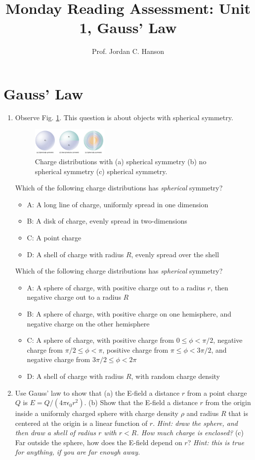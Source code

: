 \documentclass{article}
\begin{document}
\title{Monday Reading Assessment: Unit 1, Gauss' Law}
\author{Prof. Jordan C. Hanson}

\maketitle

\section{Gauss' Law}

\begin{enumerate}
\item Observe Fig. \ref{fig:spheres1}.  This question is about objects with spherical symmetry.
\begin{figure}[ht]
\centering
\includegraphics[width=0.35\textwidth]{spheres.png}
\caption{\label{fig:spheres1} Charge distributions with (a) spherical symmetry (b) no spherical symmetry (c) spherical symmetry.}
\end{figure}
Which of the following charge distributions has \textit{spherical} symmetry?
\begin{itemize}
\item A: A long line of charge, uniformly spread in one dimension
\item B: A disk of charge, evenly spread in two-dimensions
\item C: A point charge
\item D: A shell of charge with radius $R$, evenly spread over the shell
\end{itemize}
Which of the following charge distributions has \textit{spherical} symmetry?
\begin{itemize}
\item A: A sphere of charge, with positive charge out to a radius $r$, then negative charge out to a radius $R$
\item B: A sphere of charge, with positive charge on one hemisphere, and negative charge on the other hemisphere
\item C: A sphere of charge, with positive charge from $0 \leq \phi < \pi/2$, negative charge from $\pi/2 \leq \phi < \pi$, positive charge from $\pi \leq \phi < 3\pi/2$, and negative charge from $3\pi/2 \leq \phi < 2\pi$
\item D: A shell of charge with radius $R$, with random charge density
\end{itemize}
\item Use Gauss' law to show that (a) the E-field a distance $r$ from a point charge $Q$ is $E = Q/\left(4\pi \epsilon_0 r^2\right)$.  (b) Show that the E-field a distance $r$ from the origin inside a uniformly charged sphere with charge density $\rho$ and radius $R$ that is centered at the origin is a linear function of $r$.  \textit{Hint: draw the sphere, and then draw a shell of radius $r$ with $r<R$.  How much charge is enclosed?} (c) Far outside the sphere, how does the E-field depend on $r$?  \textit{Hint: this is true for anything, if you are far enough away.}
\end{enumerate}
\end{document}
